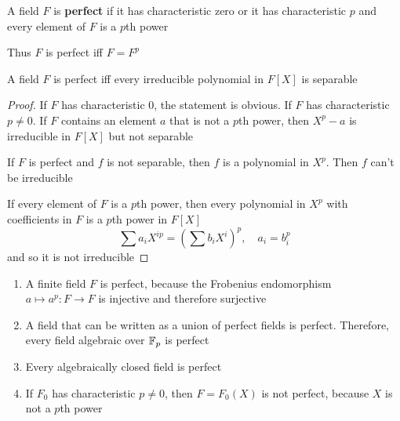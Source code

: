 \documentclass[11pt]{article}
\begin{document}
\begin{definition}[]
A field \(F\) is \textbf{perfect} if it has characteristic zero  or it has characteristic \(p\) and every
element of \(F\) is a \(p\)th power
\end{definition}

Thus \(F\) is perfect iff \(F=F^p\)

\begin{proposition}[]
A field \(F\) is perfect iff every irreducible polynomial in \(F[X]\) is separable
\end{proposition}

\begin{proof}
If \(F\) has characteristic 0, the statement is obvious. If \(F\) has characteristic \(p\neq 0\).
If \(F\) contains an element \(a\) that is not a \(p\)th power, then \(X^p-a\) is irreducible
in \(F[X]\) but not separable

If \(F\) is perfect and \(f\) is not separable, then \(f\) is a polynomial in \(X^p\). Then \(f\)
can't be irreducible

If every element of \(F\) is a \(p\)th power, then every polynomial in \(X^p\) with coefficients
in \(F\) is a \(p\)th power in \(F[X]\)
\begin{equation*}
\sum a_iX^{ip}=(\sum b_iX^i)^p,\quad a_i=b_i^p
\end{equation*}
and so it is not irreducible
\end{proof}

\begin{examplle}[]
\label{Problem1}
\begin{enumerate}
\item A finite field \(F\) is perfect, because the Frobenius endomorphism \(a\mapsto a^p:F\to F\) is
injective and therefore surjective
\item A field that can be written as a union of perfect fields is perfect. Therefore, every field
algebraic over \(\mathbb{F}_p\) is perfect
\item Every algebraically closed field is perfect
\item If \(F_0\) has characteristic \(p\neq 0\), then \(F=F_0(X)\) is not perfect, because \(X\) is
not a \(p\)th power
\end{enumerate}
\end{examplle}
\end{document}
